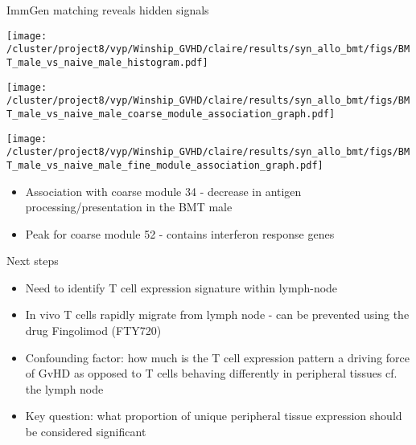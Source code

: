\documentclass[final,hyperref={pdfpagelabels=false}]{beamer}
\begin{document}
\begin{frame}{}
\begin{columns}[t]
\begin{column}{.36\linewidth}
\begin{block}{ImmGen matching reveals hidden signals}
\begin{minipage}{0.30\textwidth}
        \texttt{[image: /cluster/project8/vyp/Winship\_GVHD/claire/results/syn\_allo\_bmt/figs/BMT\_male\_vs\_naive\_male\_histogram.pdf]}
      \end{minipage}
  \hfill
      \begin{minipage}{0.30\textwidth}
        \texttt{[image: /cluster/project8/vyp/Winship\_GVHD/claire/results/syn\_allo\_bmt/figs/BMT\_male\_vs\_naive\_male\_coarse\_module\_association\_graph.pdf]}
      \end{minipage}
  \hfill
  \begin{minipage}{0.30\textwidth}
        \texttt{[image: /cluster/project8/vyp/Winship\_GVHD/claire/results/syn\_allo\_bmt/figs/BMT\_male\_vs\_naive\_male\_fine\_module\_association\_graph.pdf]}
      \end{minipage}
  \hfill
{\small \begin{itemize}
\item Association with coarse module 34 - decrease in antigen processing/presentation in the BMT male
\item Peak for coarse module 52 - contains interferon response genes  
\end{itemize}}
    \end{block}


\begin{block}{Next steps}
{\small  \begin{itemize}
        \item Need to identify T cell expression signature within lymph-node
    \item In vivo T cells rapidly migrate from lymph node - can be prevented using the drug Fingolimod (FTY720)
      \item Confounding factor: how much is the T cell expression pattern a driving force of GvHD as opposed to T cells behaving differently in peripheral tissues cf. the lymph node
      \item Key question: what proportion of unique peripheral tissue expression should be considered significant 
      \end{itemize}}
\end{block}

\vspace{10cm}
\end{column}
\end{columns}
\end{frame}
\end{document}

